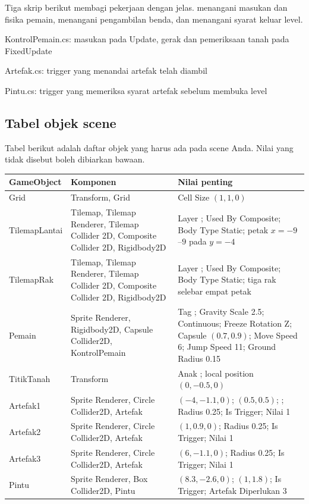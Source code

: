 
Tiga skrip berikut membagi pekerjaan dengan jelas. 
menangani masukan dan fisika pemain,  menangani pengambilan
benda, dan  menangani syarat keluar level.

  {KontrolPemain.cs: masukan pada Update, gerak dan pemeriksaan tanah pada FixedUpdate}

  {Artefak.cs: trigger yang menandai artefak telah diambil}

  {Pintu.cs: trigger yang memeriksa syarat artefak sebelum membuka level}

\subsection*{Tabel objek scene}

Tabel berikut adalah daftar objek yang harus ada pada scene Anda. Nilai yang
tidak disebut boleh dibiarkan bawaan.

{\footnotesize
\renewcommand{\arraystretch}{1.3}
\begin{tabularx}{\linewidth}{@{}L{2.4cm} L{3.5cm} Y@{}}
\toprule
\textbf{GameObject} & \textbf{Komponen} & \textbf{Nilai penting} \\
\midrule
Grid & Transform, Grid &
  Cell Size $(1,1,0)$ \\
TilemapLantai & Tilemap, Tilemap Renderer, Tilemap Collider 2D,
  Composite Collider 2D, Rigidbody2D &
  Layer ; Used By Composite; Body Type Static; petak
  $x=-9$--$9$ pada $y=-4$ \\
TilemapRak & Tilemap, Tilemap Renderer, Tilemap Collider 2D,
  Composite Collider 2D, Rigidbody2D &
  Layer ; Used By Composite; Body Type Static; tiga rak selebar
  empat petak \\
Pemain & Sprite Renderer, Rigidbody2D, Capsule Collider2D, KontrolPemain &
  Tag ; Gravity Scale 2.5; Continuous; Freeze Rotation Z;
  Capsule $(0.7,0.9)$; Move Speed 6; Jump Speed 11; Ground Radius 0.15 \\
TitikTanah & Transform &
  Anak ; local position $(0,-0.5,0)$ \\
Artefak1 & Sprite Renderer, Circle Collider2D, Artefak &
  $(-4,-1.1,0)$; $(0.5,0.5)$; ; Radius 0.25; Is Trigger;
  Nilai 1 \\
Artefak2 & Sprite Renderer, Circle Collider2D, Artefak &
  $(1,0.9,0)$; Radius 0.25; Is Trigger; Nilai 1 \\
Artefak3 & Sprite Renderer, Circle Collider2D, Artefak &
  $(6,-1.1,0)$; Radius 0.25; Is Trigger; Nilai 1 \\
Pintu & Sprite Renderer, Box Collider2D, Pintu &
  $(8.3,-2.6,0)$; $(1,1.8)$; Is Trigger; Artefak Diperlukan 3 \\
\bottomrule
\end{tabularx}
}

